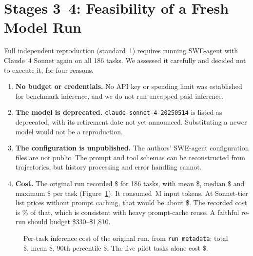 \documentclass[11pt,a4paper]{article}
\begin{document}
\section{Stages 3--4: Feasibility of a Fresh Model Run}
\label{sec:fresh}
Full independent reproduction (standard~1) requires running SWE-agent with Claude~4 Sonnet again on all 186 tasks.
We assessed it carefully and decided not to execute it, for four reasons.
\begin{enumerate}[nosep]
  \item \textbf{No budget or credentials.} No API key or spending limit was established for benchmark inference,
  and we do not run uncapped paid inference.
  \item \textbf{The model is deprecated.} \texttt{claude-sonnet-4-20250514} is listed as deprecated, with its
  retirement date not yet announced. Substituting a newer model would not be a reproduction.
  \item \textbf{The configuration is unpublished.} The authors' SWE-agent configuration files are not public. The
  prompt and tool schemas can be reconstructed from trajectories, but history processing and error handling cannot.
  \item \textbf{Cost.} The original run recorded \$\CostTotal{} for 186 tasks, with mean \$\CostMean{}, median
  \$\CostMedian{} and maximum \$\CostMax{} per task (Figure~\ref{fig:cost}). It consumed \TokIn{}\,M input tokens.
  At Sonnet-tier list prices without prompt caching, that would be about \$\CostUncached{}. The recorded cost is
  \CostRatio\% of that, which is consistent with heavy prompt-cache reuse. A faithful re-run should budget
  \$330--\$1{,}810.
\end{enumerate}

\begin{figure}[h]
\centering
{}
\caption{Per-task inference cost of the original run, from \texttt{run\_metadata}: total \$\CostTotal, mean
\$\CostMean, 90th percentile \$\CostPNinety. The five pilot tasks alone cost \$\CostPilot.}
\label{fig:cost}
\end{figure}
\end{document}
